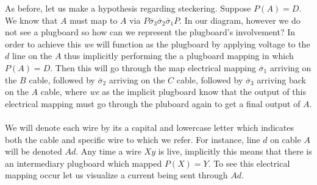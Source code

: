     As before, let us make a hypothesis regarding steckering. Suppose $P(A) = D$. We know that $A$ must map to $A$ via 
    $P\overline\sigma_3\overline\sigma_2\overline\sigma_1 P$. In our diagram, however we do not see a plugboard so how can we represent the plugboard's involvement? In order 
    to achieve this \emph{we} will function as the plugboard by applying voltage to the $d$ line on the $A$ thus implicitly performing the a plugboard mapping in which $P(A) = D$. 
    Then this will go through the map electrical mapping $\overline\sigma_1$ arriving on the $B$ cable, followed by $\overline\sigma_2$ arriving on the $C$ cable, followed by $\overline\sigma_3$ arriving back on the $A$ cable, where \emph{we} as the implicit plugboard know that 
    the output of this electrical mapping must go through the pluboard again to get a final output of $A$.
    \\\\We will denote each wire by its a capital and lowercase letter which indicates both the cable and specific wire to which we refer. For instance, line $d$ on cable $A$ will be denoted $Ad$. Any time a wire 
    $Xy$ is live, implicitly this means that there is an intermediary plugboard which mapped $P(X) = Y$. 
    To see this electrical mapping occur let us visualize a current being sent through $Ad$.
